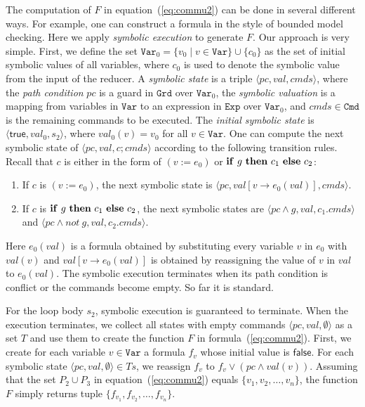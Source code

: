 \documentclass{llncs}
\newcommand{\Var}{\mathtt{Var}}
\newcommand{\Exp}{\mathtt{Exp}}
\newcommand{\Cmd}{\mathtt{Cmd}}
\newcommand{\Grd}{\mathtt{Grd}}
\newcommand{\true}{\mathsf{true}}
\newcommand{\false}{\mathsf{false}}
\newcommand{\ite}[3]{
	 \ifmmode 
	 \mathbf{if}\ #1 \ \mathbf{then}\ #2\  \mathbf{else}\ #3 
	 \else
	 \textbf{if}\ #1 \ \textbf{then}\ #2\  \textbf{else}\ #3
	 \fi}
\begin{document}
The computation of $F$ in equation~(\ref{eq:commu2}) can be done in several different ways. For example, one can construct a formula in the style of bounded model checking. Here we apply \emph{symbolic execution} to generate $F$. Our approach is very simple. First, we define the set $\Var_0=\{v_0 \mid v \in \Var \}\cup \{c_0\}$ as the set of initial symbolic values of all variables, where $c_0$ is used to denote the symbolic value from the input of the reducer.
A \emph{symbolic state} is a triple $\langle pc, val, cmds \rangle$, where the \emph{path condition} $pc$ is a guard in $\Grd$ over $\Var_0$, the \emph{symbolic valuation} is a mapping from variables in $\Var$ to an expression in $\Exp$ over $\Var_0$, and $cmds\in \Cmd$ is the remaining commands to be executed. The \emph{initial symbolic state} is $\langle \true, val_0, s_2\rangle$, where $val_0(v) = v_0$ for all $v\in\Var$. 
One can compute the next symbolic state of $\langle pc, val, c;cmds \rangle$ according to the following transition rules. Recall that $c$ is either in the form of $(v:= e_0)$ or $\ite{g}{c_1}{c_2}$:
\begin{enumerate}
	\item If $c$ is $(v:= e_0)$, the next symbolic state is $\langle pc, val[v \rightarrow e_0(val) ], cmds \rangle$.
	\item  If $c$ is $\ite{g}{c_1}{c_2}$, the next symbolic states are $\langle pc\wedge g, val, c_1.cmds \rangle$ and $\langle pc\wedge not\  g, val, c_2.cmds \rangle$. 
\end{enumerate}

Here $e_0(val)$ is a formula obtained by substituting every variable $v$ in $e_0$ with $val(v)$ and $val[v \rightarrow e_0(val) ]$ is obtained by reassigning the value of $v$ in $val$ to $e_0(val)$. The symbolic execution terminates when its path condition is conflict or the commands become empty. So far it is standard. 

For the loop body $s_2$, symbolic execution is guaranteed to terminate.
When the execution terminates, we collect all states with empty commands $\langle pc, val, \emptyset \rangle$ as a set $T$ and use them to create the function $F$ in formula~(\ref{eq:commu2}). 
First, we create for each variable $v\in\Var$ a formula $f_v$ whose initial value is $\false$. For each symbolic state $\langle pc, val, \emptyset \rangle \in Ts$, we reassign $f_v$ to $f_v \vee (pc \wedge val(v))$. 
Assuming that the set $P_2\cup P_3$ in equation~(\ref{eq:commu2}) equals $\{v_1,v_2,\ldots,v_n\}$, the function $F$ simply returns tuple $\{f_{v_1},f_{v_2},\ldots, f_{v_n}\}$.
 
\end{document}

